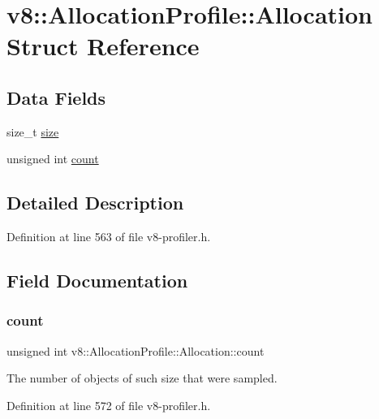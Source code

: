 \hypertarget{structv8_1_1AllocationProfile_1_1Allocation}{}\section{v8\+:\+:Allocation\+Profile\+:\+:Allocation Struct Reference}
\label{structv8_1_1AllocationProfile_1_1Allocation}
\subsection*{Data Fields}
\begin{DoxyCompactItemize}
\item 
size\+\_\+t \mbox{\hyperlink{structv8_1_1AllocationProfile_1_1Allocation_a346410fa5dfb796dff396069897c0aba}{size}}
\item 
unsigned int \mbox{\hyperlink{structv8_1_1AllocationProfile_1_1Allocation_a012fe5238f5ebec039d7832f2d3ae8ed}{count}}
\end{DoxyCompactItemize}


\subsection{Detailed Description}


Definition at line 563 of file v8-\/profiler.\+h.



\subsection{Field Documentation}
\mbox{\label{structv8_1_1AllocationProfile_1_1Allocation_a012fe5238f5ebec039d7832f2d3ae8ed}} 
\subsubsection{\texorpdfstring{count}{count}}
{\footnotesize\ttfamily unsigned int v8\+::\+Allocation\+Profile\+::\+Allocation\+::count}

The number of objects of such size that were sampled. 

Definition at line 572 of file v8-\/profiler.\+h.

